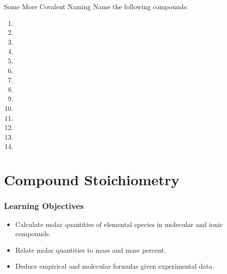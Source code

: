 \documentclass[handout]{beamer}
\begin{document}
\begin{frame}[t]{Some More Covalent Naming}
	Name the following compounds:
	\begin{multicols}{2}
		\begin{enumerate}
			\item {}
			\item {}
			\item {}
			\item {}
			\item {}
			\item {}
			\item {}
			\item {}
			\item {}
			\item {}
			\item {}
			\item {}
			\item {}
			\item {}
		\end{enumerate}
	\end{multicols}
\end{frame}

%

\section{Compound Stoichiometry}

\begin{frame}
	\frametitle{Learning Objectives}
	\begin{itemize}
	\item Calculate molar quantities of elemental species in molecular and ionic compounds.
	\item Relate molar quantities to mass and mass percent.
	\item Deduce empirical and molecular formulas given experimental data.
	\end{itemize}
\end{frame}
\end{document}
